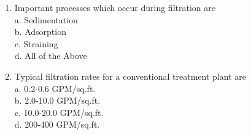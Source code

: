 \begin{enumerate}
\item Important processes which occur during filtration are \\
a. Sedimentation \\
b. Adsorption \\
c. Straining \\
d. All of the Above \\

\item Typical filtration rates for a conventional treatment plant are \\
a. 0.2-0.6 GPM/sq.ft. \\
b. 2.0-10.0 GPM/sq.ft. \\
c. 10.0-20.0 GPM/sq.ft. \\
d. 200-400 GPM/sq.ft. \\

\end{enumerate}

